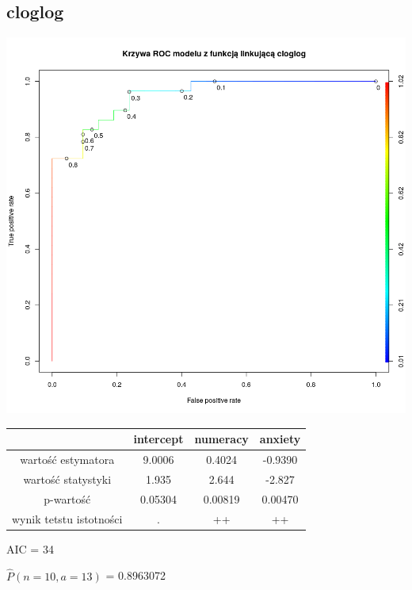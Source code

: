 \documentclass[a4paper,11pt]{article}
\begin{document}
\subsection{cloglog}
\includegraphics[scale=.25]{plot4.png} 

\begin{tabular}{|c|c|c|c|}
 & intercept & numeracy & anxiety \\ \hline
 wartość estymatora & 9.0006 & 0.4024 &  -0.9390   \\
 wartość statystyki &  1.935 & 2.644 &  -2.827  \\
 p-wartość &    0.05304  &  0.00819  &  0.00470    \\
 wynik tetstu istotności & . & ++ & ++ \\ \hline
\end{tabular}

AIC = 34

$\widehat{P}(n  = 10, a = 13)$  = 0.8963072
\end{document}
